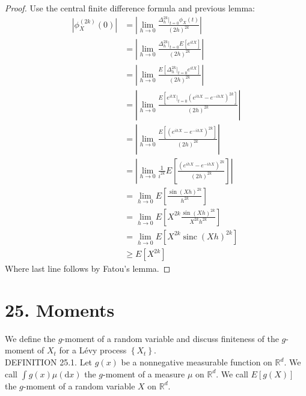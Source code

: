 \documentclass[a4paper,11pt]{article}
\begin{document}
\begin{proof}
    Use the central finite difference formula and previous lemma:
    \begin{align}
        |\phi_{X}^{(2k)}(0)| & = \left|\lim_{h \to 0} \frac{\Delta^{2k}_{h}|_{t=0} \phi_{X}(t)}{(2h)^{2k}}\right|                      \\
                             & = \left|\lim_{h \to 0} \frac{\Delta^{2k}_{h}|_{t=0} E\left[e^{itX}\right]}{(2h)^{2k}}\right|            \\
                             & = \left|\lim_{h \to 0} \frac{ E\left[\Delta^{2k}_{h}|_{t=0}e^{itX}\right]}{(2h)^{2k}}\right|            \\
                             & = \left|\lim_{h \to 0} \frac{ E\left[e^{itX} |_{t=0} (e^{ihX}-e^{-ihX})^{2k}\right]}{(2h)^{2k}}\right|  \\
                             & = \left|\lim_{h \to 0} \frac{ E\left[(e^{ihX}-e^{-ihX})^{2k}\right]}{(2h)^{2k}}\right|                  \\
                             & = \left|\lim_{h \to 0} \frac{1}{i^{2k}}E\left[\frac{ (e^{ihX}-e^{-ihX})^{2k}}{(2h)^{2k}} \right]\right| \\
                             & = \lim_{h \to 0} E\left[\frac{ \sin(Xh)^{2k}}{h^{2k}}\right]                                            \\
                             & = \lim_{h \to 0} E\left[ X^{2k}\frac{ \sin(Xh)^{2k}}{X^{2k} h^{2k}}\right]                              \\
                             & = \lim_{h \to 0} E\left[ X^{2k} \operatorname{sinc}(Xh) ^{2k}\right]                                    \\
                             & \ge  E\left[ X^{2k} \right]
    \end{align}
    Where last line follows by Fatou's lemma.
\end{proof}




\section*{25. Moments}
We define the $g$-moment of a random variable and discuss finiteness of the $g$-moment of $X_{t}$ for a Lévy process
$\left\{X_{t}\right\}$. \\

DEFINITION 25.1. Let $g(x)$ be a nonnegative measurable function on $\mathbb{R}^{d}$. We call
$\int g(x) \mu(\mathrm{d} x)$ the $g$-moment of a measure $\mu$ on $\mathbb{R}^{d}$. We call $E[g(X)]$ the $g$-moment of
a random variable $X$ on $\mathbb{R}^{d}$. \\
\end{document}
